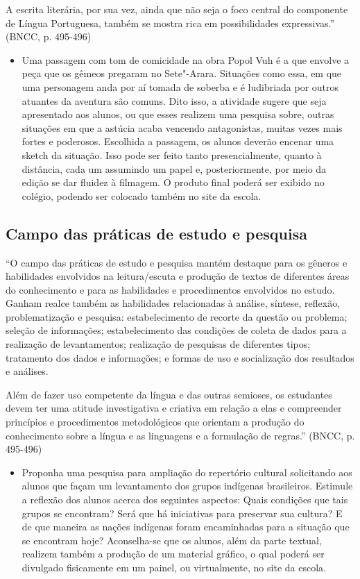\documentclass[12pt]{extarticle}
\begin{document}
A escrita literária, por sua vez, ainda que não seja o foco central do
componente de Língua Portuguesa, também se mostra rica em possibilidades
expressivas.'' (BNCC, p. 495-496)

\begin{itemize}
\item
  Uma passagem com tom de comicidade na obra Popol Vuh é a que envolve a
  peça que os gêmeos pregaram no Sete"-Arara. Situações como essa, em que
  uma personagem anda por aí tomada de soberba e é ludibriada por outros
  atuantes da aventura são comuns. Dito isso, a atividade sugere que
  seja apresentado aos alunos, ou que esses realizem uma pesquisa sobre,
  outras situações em que a astúcia acaba vencendo antagonistas, muitas
  vezes mais fortes e poderosos. Escolhida a passagem, os alunos deverão
  encenar uma sketch da situação. Isso pode ser feito tanto
  presencialmente, quanto à distância, cada um assumindo um papel e,
  posteriormente, por meio da edição se dar fluidez à filmagem. O
  produto final poderá ser exibido no colégio, podendo ser colocado
  também no site da escola.
\end{itemize}

\subsection{Campo das práticas de estudo e pesquisa }

``O campo das práticas de estudo e pesquisa mantém destaque para os
gêneros e habilidades envolvidos na leitura/escuta e produção de textos
de diferentes áreas do conhecimento e para as habilidades e
procedimentos envolvidos no estudo. Ganham realce também as habilidades
relacionadas à análise, síntese, reflexão, problematização e pesquisa:
estabelecimento de recorte da questão ou problema; seleção de
informações; estabelecimento das condições de coleta de dados para a
realização de levantamentos; realização de pesquisas de diferentes
tipos; tratamento dos dados e informações; e formas de uso e
socialização dos resultados e análises.

Além de fazer uso competente da língua e das outras semioses, os
estudantes devem ter uma atitude investigativa e criativa em relação a
elas e compreender princípios e procedimentos metodológicos que orientam
a produção do conhecimento sobre a língua e as linguagens e a formulação
de regras.'' (BNCC, p. 495-496)

\begin{itemize}
\item
  Proponha uma pesquisa para ampliação do repertório cultural
  solicitando aos alunos que façam um levantamento dos grupos indígenas
  brasileiros. Estimule a reflexão dos alunos acerca dos seguintes
  aspectos: Quais condições que tais grupos se encontram? Será que há
  iniciativas para preservar sua cultura? E de que maneira as nações
  indígenas foram encaminhadas para a situação que se encontram hoje?
  Aconselha-se que os alunos, além da parte textual, realizem também a
  produção de um material gráfico, o qual poderá ser divulgado
  fisicamente em um painel, ou virtualmente, no site da escola.
\end{itemize}
\end{document}
